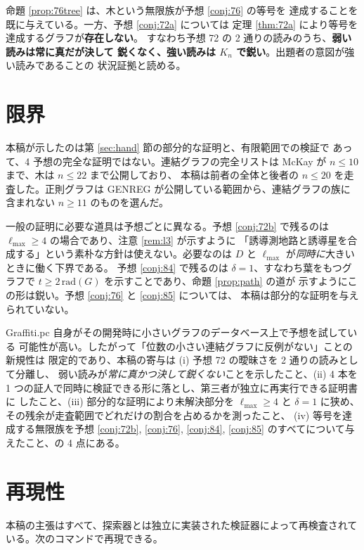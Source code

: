 \documentclass[paper=a4,fontsize=10.5pt,jafontsize=10.5pt]{jlreq}
\theoremstyle{plain}
\theoremstyle{definition}
\begin{document}
命題 \ref{prop:76tree} は、木という無限族が予想 \ref{conj:76} の等号を
達成することを既に与えている。一方、予想 \ref{conj:72a} については
定理 \ref{thm:72a} により等号を達成するグラフが\textbf{存在しない}。
すなわち予想 72 の 2 通りの読みのうち、\textbf{弱い読みは常に真だが決して
鋭くなく、強い読みは $K_n$ で鋭い}。出題者の意図が強い読みであることの
状況証拠と読める。

\section{限界}

本稿が示したのは第 \ref{sec:hand} 節の部分的な証明と、有限範囲での検証で
あって、4 予想の完全な証明ではない。連結グラフの完全リストは McKay
\cite{mckay} が $n \le 10$ まで、木は $n \le 22$ まで公開しており、
本稿は前者の全体と後者の $n \le 20$ を走査した。正則グラフは GENREG
\cite{genreg} が公開している範囲から、連結グラフの族に含まれない
$n \ge 11$ のものを選んだ。

一般の証明に必要な道具は予想ごとに異なる。予想 \ref{conj:72b} で残るのは
$\ell_{\max} \ge 4$ の場合であり、注意 \ref{rem:l3} が示すように
「誘導測地路と誘導星を合成する」という素朴な方針は使えない。必要なのは
$D$ と $\ell_{\max}$ が\emph{同時に}大きいときに働く下界である。
予想 \ref{conj:84} で残るのは $\delta = 1$、すなわち葉をもつグラフで
$t \ge 2\,\mathrm{rad}(G)$ を示すことであり、命題 \ref{prop:path} の道が
示すようにこの形は鋭い。予想 \ref{conj:76} と \ref{conj:85} については、
本稿は部分的な証明を与えられていない。

Graffiti.pc 自身がその開発時に小さいグラフのデータベース上で予想を試している
可能性が高い。したがって「位数の小さい連結グラフに反例がない」ことの新規性は
限定的であり、本稿の寄与は (i) 予想 72 の曖昧さを 2 通りの読みとして分離し、
弱い読みが\emph{常に真かつ決して鋭くない}ことを示したこと、(ii) 4 本を
1 つの証人で同時に検証できる形に落とし、第三者が独立に再実行できる証明書に
したこと、(iii) 部分的な証明により未解決部分を $\ell_{\max} \ge 4$ と
$\delta = 1$ に狭め、その残余が走査範囲でどれだけの割合を占めるかを測ったこと、
(iv) 等号を達成する無限族を予想 \ref{conj:72b}, \ref{conj:76},
\ref{conj:84}, \ref{conj:85} のすべてについて与えたこと、の 4 点にある。


\section*{再現性}
本稿の主張はすべて、探索器とは独立に実装された検証器によって再検査されている。次のコマンドで再現できる。
\end{document}
